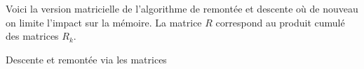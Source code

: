 Voici la version matricielle de l'algorithme de remontée et descente où de nouveau on limite l'impact sur la mémoire. La matrice $R$ correspond au produit cumulé des matrices $R_k$.


\begin{algo}
	\caption{Descente et remontée via les matrices} \label{algo-human-matrix}
	\addalgoblank
\end{algo}

